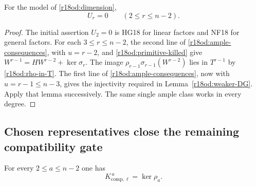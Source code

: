 \begin{proposition}
\label{r18od:all-U}
For the model of \eqref{r18od:dimension},
\[
                               U_r=0
                     \qquad(2\le r\le n-2).
 \tag{OD18.14}\label{r18od:U-vanishes}
\]
\end{proposition}

\begin{proof}
The initial assertion $U_2=0$ is HG18 for linear factors and
NF18 for general factors.  For each $3\le r\le n-2$, the
second line of \eqref{r18od:ample-consequences}, with $u=r-2$,
and \eqref{r18od:primitive-killed} give
$W^{r-1}=H W^{r-2}+\ker\sigma_r$.
The image $\rho_{r-1}\sigma_{r-1}(W^{r-2})$ lies in
$T^{r-1}$ by \eqref{r18od:rho-in-T}.
The first line of \eqref{r18od:ample-consequences}, now with
$u=r-1\le n-3$, gives the injectivity required in
Lemma~\ref{r18od:weaker-DG}.  Apply that lemma successively.
The same single ample class works in every degree.
\end{proof}

\subsection{Chosen representatives close the remaining compatibility gate}

\begin{proposition}
\label{r18od:K-equals-B}
For every $2\le a\le n-2$ one has
\[
                     K_{\mathrm{comp},\ell}^{\,a}=\ker\rho_a.
 \tag{OD18.15}\label{r18od:K-B}
\]
\end{proposition}

